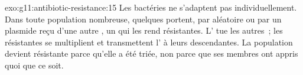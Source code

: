 \begin{solution}{exo:g11:antibiotic-resistance:15}
Les bactéries ne s'adaptent pas individuellement. Dans toute population
nombreuse, quelques  portent, par  aléatoire ou par un
plasmide reçu d'une autre , un  qui les rend résistantes.
L' tue les autres~; les  résistantes se multiplient
et transmettent l' à leurs descendantes. La population devient
résistante parce qu'elle a été triée, non parce que ses membres ont
appris quoi que ce soit.
\end{solution}

